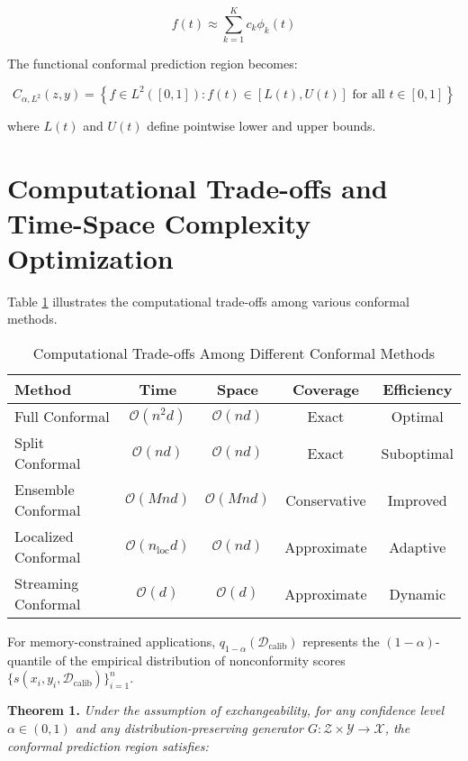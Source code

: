 \documentclass{article}
\theoremstyle{plain}
\theoremstyle{definition}
\theoremstyle{remark}
\begin{document}
\begin{equation}
f(t) \approx \sum_{k=1}^K c_k \phi_k(t)
\end{equation}

The functional conformal prediction region becomes:

\begin{equation}
C_{\alpha, L^2}(z, y) = \left\{f \in L^2([0, 1]) : f(t) \in [L(t), U(t)] \text{ for all } t \in [0, 1]\right\}
\end{equation}

where $L(t)$ and $U(t)$ define pointwise lower and upper bounds.

\section{Computational Trade-offs and Time-Space Complexity Optimization}

Table \ref{tab:tradeoffs} illustrates the computational trade-offs among various conformal methods.

\begin{table}[htbp]
\centering
\caption{Computational Trade-offs Among Different Conformal Methods}
\label{tab:tradeoffs}
\begin{tabular}{|l|c|c|c|c|}
\hline
\textbf{Method} & \textbf{Time} & \textbf{Space} & \textbf{Coverage} & \textbf{Efficiency} \\
\hline
Full Conformal & $\mathcal{O}(n^2d)$ & $\mathcal{O}(nd)$ & Exact & Optimal \\
\hline
Split Conformal & $\mathcal{O}(nd)$ & $\mathcal{O}(nd)$ & Exact & Suboptimal \\
\hline
Ensemble Conformal & $\mathcal{O}(Mnd)$ & $\mathcal{O}(Mnd)$ & Conservative & Improved \\
\hline
Localized Conformal & $\mathcal{O}(n_{\text{loc}}d)$ & $\mathcal{O}(nd)$ & Approximate & Adaptive \\
\hline
Streaming Conformal & $\mathcal{O}(d)$ & $\mathcal{O}(d)$ & Approximate & Dynamic \\
\hline
\end{tabular}
\end{table}

For memory-constrained applications, $q_{1-\alpha}(\mathcal{D}_{\text{calib}})$ represents the $(1-\alpha)$-quantile of the empirical distribution of nonconformity scores $\{s(x_i, y_i, \mathcal{D}_{\text{calib}})\}_{i=1}^n$.

\textbf{Theorem 1.} \textit{Under the assumption of exchangeability, for any confidence level $\alpha \in (0,1)$ and any distribution-preserving generator $G: \mathcal{Z} \times \mathcal{Y} \rightarrow \mathcal{X}$, the conformal prediction region satisfies:}
\end{document}
